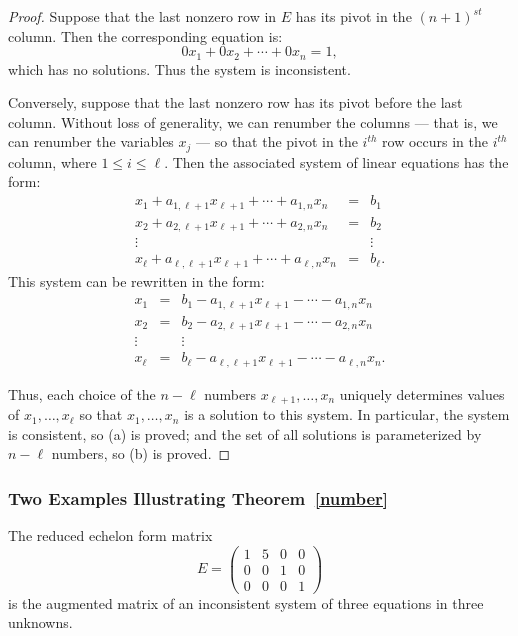 \documentclass{ximera}
\begin{document}
\begin{proof}  Suppose that the last nonzero row in $E$ has its
pivot in the $(n+1)^{st}$ column. Then the corresponding
equation is:
\[
0x_1 + 0x_2 + \cdots + 0x_n = 1,
\]
which has no solutions.  Thus the system is inconsistent.

Conversely, suppose that the last nonzero row has its pivot
before the last column.  Without loss of generality, we can
renumber the columns --- that is, we can renumber the variables
$x_j$ --- so that the pivot in the $i^{th}$ row occurs in the
$i^{th}$ column, where $1\leq i\leq\ell$.  Then the associated
system of linear equations has the form:
\begin{eqnarray*}
x_1 + a_{1,\ell+1}x_{\ell+1} + \cdots + a_{1,n}x_n & = &  b_1 \\
x_2 + a_{2,\ell+1}x_{\ell+1} + \cdots + a_{2,n}x_n & = &  b_2 \\
\vdots &   &    \vdots  \\
x_\ell + a_{\ell,\ell+1}x_{\ell+1} + \cdots + a_{\ell,n}x_n & = & b_\ell.
\end{eqnarray*}
This system can be rewritten in the form:
\begin{eqnarray}
  x_1  & = &  b_1 - a_{1,\ell+1}x_{\ell+1} - \cdots - a_{1,n}x_n
\nonumber\\
  x_2  & = &  b_2 - a_{2,\ell+1}x_{\ell+1} - \cdots - a_{2,n}x_n
\label{e1-ell}\\
\vdots &   &    \vdots \nonumber \\
x_\ell & = &  b_\ell - a_{\ell,\ell+1}x_{\ell+1} - \cdots -
a_{\ell,n}x_n.
\nonumber
\end{eqnarray}

Thus, each choice of the $n-\ell$ numbers
$x_{\ell+1},\ldots,x_n$ uniquely determines values of
$x_1,\ldots,x_\ell$ so that $x_1,\ldots,x_n$ is a solution to
this system.  In particular, the system is consistent, so (a) is
proved; and the set of all solutions is parameterized by
$n-\ell$ numbers, so (b) is proved.  \end{proof}

\subsubsection*{Two Examples Illustrating Theorem~\ref{number}}

The reduced echelon form matrix
\[
E = \left(\begin{array}{ccc|c} 1 & 5 & 0 & 0 \\ 0 & 0 & 1 & 0\\
	0 & 0 & 0 & 1 \end{array}\right)
\]
is the augmented matrix of an inconsistent system of three equations
in three unknowns.
\end{document}
